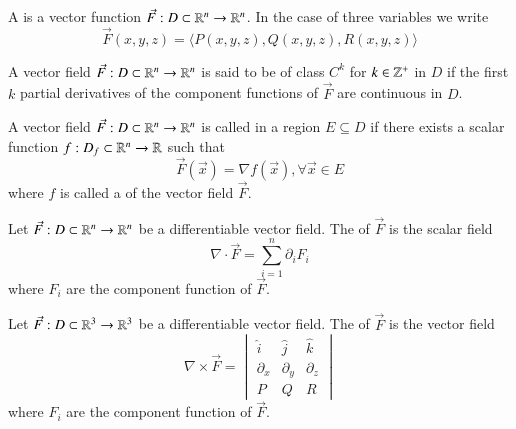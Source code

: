 \begin{appendices}
    \begin{defn}
        A  is a vector function $\vec{F}:D\subset \mathbb R^n \rightarrow \mathbb R^n$. In the case of three variables we write \begin{equation}
            \vec{F}(x,y,z) = \langle P(x,y,z), Q(x,y,z), R(x,y,z)\rangle
        \end{equation}
    \end{defn}
    
    \begin{rmk}
        A vector field $\vec{F}:D\subset \mathbb R^n \rightarrow \mathbb R^n$ is said to be of class $C^k$ for $k \in \mathbb Z^{+}$ in $D$ if the first $k$ partial derivatives of the component functions of $\vec{F}$ are continuous in $D$.
    \end{rmk}
    
    \begin{defn}
        A vector field $\vec{F}:D\subset \mathbb R^n \rightarrow \mathbb R^n$ is called  in a region $E \subseteq D$ if there exists a scalar function $f:D_f \subset \mathbb R^n \rightarrow \mathbb R$ such that \begin{equation}
            \vec{F}(\vec{x}) = \nabla f(\vec{x}), \forall \vec{x} \in E
        \end{equation}
        where $f$ is called a  of the vector field $\vec{F}$.
    \end{defn}
    
    \begin{defn}
        Let $\vec{F}:D\subset \mathbb R^n \rightarrow \mathbb R^n$ be a differentiable vector field. The  of $\vec{F}$ is the scalar field \begin{equation}
            \nabla\cdot \vec{F} = \sum\limits_{i=1}^n\partial_iF_i
        \end{equation}
        where $F_i$ are the component function of $\vec{F}$.
    \end{defn}
    
    \begin{defn}
        Let $\vec{F}:D\subset \mathbb R^3 \rightarrow \mathbb R^3$ be a differentiable vector field. The  of $\vec{F}$ is the vector field \begin{equation}
            \nabla\times \vec{F} = \begin{vmatrix} \hat{i} & \hat{j} & \hat{k} \\ \partial_x & \partial_y & \partial_z \\ P & Q & R \end{vmatrix}
        \end{equation}
        where $F_i$ are the component function of $\vec{F}$.
    \end{defn}
    

\end{appendices}
